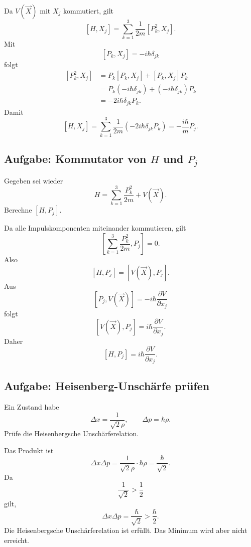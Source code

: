 \begin{calculationbox}
Da $V(\vec X)$ mit $X_j$ kommutiert, gilt
\[
    [H,X_j]=\sum_{k=1}^3\frac{1}{2m}[P_k^2,X_j].
\]
Mit
\[
    [P_k,X_j]=-i\hbar\delta_{jk}
\]
folgt
\[
\begin{aligned}
    [P_k^2,X_j]
    &=P_k[P_k,X_j]+[P_k,X_j]P_k \\
    &=P_k(-i\hbar\delta_{jk})+(-i\hbar\delta_{jk})P_k \\
    &=-2i\hbar\delta_{jk}P_k.
\end{aligned}
\]
Damit
\[
    [H,X_j]
    =\sum_{k=1}^3\frac{1}{2m}(-2i\hbar\delta_{jk}P_k)
    =-\frac{i\hbar}{m}P_j.
\]
\end{calculationbox}

\subsection{Aufgabe: Kommutator von $H$ und $P_j$}

\begin{examplebox}
Gegeben sei wieder
\[
    H=\sum_{k=1}^3\frac{P_k^2}{2m}+V(\vec X).
\]
Berechne $[H,P_j]$.
\end{examplebox}

\begin{calculationbox}
Da alle Impulskomponenten miteinander kommutieren, gilt
\[
    \left[\sum_{k=1}^3\frac{P_k^2}{2m},P_j\right]=0.
\]
Also
\[
    [H,P_j]=[V(\vec X),P_j].
\]
Aus
\[
    [P_j,V(\vec X)]=-i\hbar\frac{\partial V}{\partial x_j}
\]
folgt
\[
    [V(\vec X),P_j]=i\hbar\frac{\partial V}{\partial x_j}.
\]
Daher
\[
    [H,P_j]=i\hbar\frac{\partial V}{\partial x_j}.
\]
\end{calculationbox}

\subsection{Aufgabe: Heisenberg-Unschärfe prüfen}

\begin{examplebox}
Ein Zustand habe
\[
    \Delta x=\frac{1}{\sqrt{2}\rho},
    \qquad
    \Delta p=\hbar\rho.
\]
Prüfe die Heisenbergsche Unschärferelation.
\end{examplebox}

\begin{calculationbox}
Das Produkt ist
\[
    \Delta x\Delta p
    =\frac{1}{\sqrt{2}\rho}\cdot\hbar\rho
    =\frac{\hbar}{\sqrt{2}}.
\]
Da
\[
    \frac{1}{\sqrt{2}}>\frac12
\]
gilt,
\[
    \Delta x\Delta p=\frac{\hbar}{\sqrt{2}}>\frac{\hbar}{2}.
\]
Die Heisenbergsche Unschärferelation ist erfüllt. Das Minimum wird aber nicht erreicht.
\end{calculationbox}

